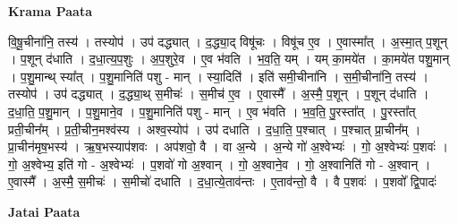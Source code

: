 \documentclass[17pt]{extarticle}
\begin{document}
\textbf{Krama Paata} \newline

वि॒षू॒चीना॑नि॒ तस्य॑ । तस्योप॑ । उप॑ दद्ध्यात् । द॒द्ध्या॒द् विषू॑चः । विषू॑च ए॒व । ए॒वास्मा᳚त् । अ॒स्मा॒त् प॒शून् । प॒शून् द॑धाति । द॒धा॒त्य॒प॒शुः । अ॒प॒शुरे॒व । ए॒व भ॑वति । भ॒व॒ति॒ यम् । यम् का॒मये॑त । का॒मये॑त पशु॒मान् । प॒शु॒मान्थ् स्या᳚त् । प॒शु॒मानिति॑ पशु - मान् । स्या॒दिति॑ । इति॑ समी॒चीना॑नि । स॒मी॒चीना॑नि॒ तस्य॑ । तस्योप॑ । उप॑ दद्ध्यात् । द॒द्ध्या॒थ् स॒मीचः॑ । स॒मीच॑ ए॒व । ए॒वास्मै᳚ । अ॒स्मै॒ प॒शून् । प॒शून् द॑धाति । द॒धा॒ति॒ प॒शु॒मान् । प॒शु॒माने॒व । प॒शु॒मानिति॑ पशु - मान् । ए॒व भ॑वति । भ॒व॒ति॒ पु॒रस्ता᳚त् । पु॒रस्ता᳚त् प्रती॒चीन᳚म् । प्र॒ती॒चीन॒मश्व॑स्य । अश्व॒स्योप॑ । उप॑ दधाति । द॒धा॒ति॒ प॒श्चात् । प॒श्चात् प्रा॒चीन᳚म् । प्रा॒चीन॑मृष॒भस्य॑ । ऋ॒ष॒भस्याप॑शवः । अप॑शवो॒ वै । वा अ॒न्ये । अ॒न्ये गो॑ अ॒श्वेभ्यः॑ । गो॒ अ॒श्वेभ्यः॑ प॒शवः॑ । गो॒ अ॒श्वेभ्य॒ इति॑ गो - अ॒श्वेभ्यः॑ । प॒शवो॑ गो अ॒श्वान् । गो॒ अ॒श्वाने॒व । गो॒ अ॒श्वानिति॑ गो - अ॒श्वान् । ए॒वास्मै᳚ । अ॒स्मै॒ स॒मीचः॑ । स॒मीचो॑ दधाति । द॒धा॒त्ये॒ताव॑न्तः । ए॒ताव॑न्तो॒ वै । वै प॒शवः॑ । प॒शवो᳚ द्वि॒पादः॑ \newline

\textbf{Jatai Paata} \newline
\end{document}
